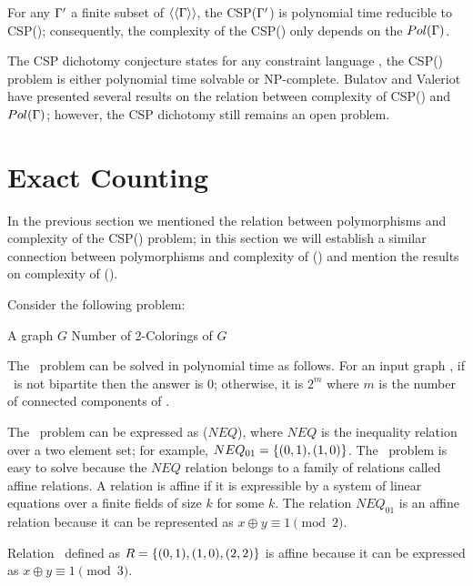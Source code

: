 \begin{cor}
For any \(\Gamma'\) a finite subset of \(\langle\langle \Gamma \rangle\rangle\),
the CSP(\(\Gamma'\)) is polynomial time reducible to  CSP(\mrelset);
consequently, the complexity of the CSP(\mrelset) only depends on the \(Pol(\Gamma)\)\@.
\end{cor}

The CSP dichotomy conjecture states for any constraint language \mrelset, 
the CSP(\mrelset) problem is either polynomial time solvable or NP-complete.
Bulatov and Valeriot \cite{recent08}
have presented several results on the relation between complexity of CSP(\mrelset) and \(Pol(\Gamma)\); however, the CSP dichotomy still remains an open problem.

\section{Exact Counting}
In the previous section we mentioned the relation between polymorphisms and complexity of
the CSP(\mrelset) problem; in this section we will establish a similar connection 
between polymorphisms and complexity of \ccsp(\mrelset) and mention the
results on complexity of \ccsp(\mrelset)\@.

Consider the following problem:

\pdef{\cdcol}
{A graph \(G\)}
{Number of 2-Colorings of \(G\)}

The \cdcol\ problem can be solved in polynomial time as follows.
For an input graph \mG, if \mG\ is not bipartite then the answer is \(0\); otherwise,
it is \(2^m\) where \(m\) is the number of connected components of \mG\@.

The \cdcol\ problem can be expressed as \ccsp(\(NEQ\)), where
\(NEQ\) is the inequality relation over a two element set; for example,
\(NEQ_{01}=\{{(0,1),(1,0)}\}\)\@. 
The \cdcol\ problem is easy to solve because
the \(NEQ\) relation belongs to a family of relations called affine relations.
A relation is affine if it is expressible by a system of linear equations over a
finite fields  of size \(k\) for some \(k\)\@. The relation \(NEQ_{01}\) is an 
affine relation because it can be represented as \(x\oplus y \equiv 1 \pmod{2}\)\@.

\begin{example}
Relation \mR\ defined as \(R=\{{(0,1),(1,0),(2,2)}\}\) is affine because it can be expressed as 
\(x \oplus y \equiv 1 \pmod{3}\)\@.
\end{example}

